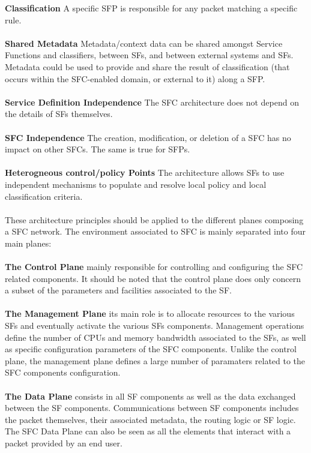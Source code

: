 \textbf{Classification} A specific SFP is responsible for any packet matching a specific rule.\\
\\
\textbf{Shared Metadata} Metadata/context data can be shared amongst Service Functions and classifiers, between SFs, and between external systems and SFs. Metadata could be used to provide and share the result of classification (that occurs within the SFC-enabled domain, or external to it) along a SFP.\\
\\ 
\textbf{Service Definition Independence} The SFC architecture does not depend on the details of SFs themselves.\\
\\
\textbf{SFC Independence} The creation, modification, or deletion of a SFC has no impact on other SFCs. The same is true for SFPs.\\
\\
\textbf{Heterogneous control/policy Points} The architecture allows SFs
to use independent mechanisms to
populate and resolve local policy and  local classification criteria.\\
\\
These architecture principles should be applied to the  different planes composing a SFC network. The environment associated to SFC is mainly separated into four main planes:\\
\\
\textbf{The Control Plane} mainly responsible for controlling and configuring the SFC related components. It should be noted that the control plane does only concern a subset of the parameters and facilities associated to the SF.\\
\\
\textbf{The Management Plane} its main role is to allocate resources to the various SFs and eventually activate the various SFs components. Management operations define the number of CPUs and memory bandwidth associated to the SFs, as well as specific configuration parameters of the SFC components. Unlike the control plane, the management plane defines a large number of paramaters related to the SFC components configuration.\\
\\
\textbf{The Data Plane} consists in all SF components as well as the data exchanged between the SF components. Communications between SF components includes the packet themselves, their associated metadata, the routing logic or SF
logic. The SFC Data Plane can also be seen as all the elements that interact with a packet provided by an end user.\\
